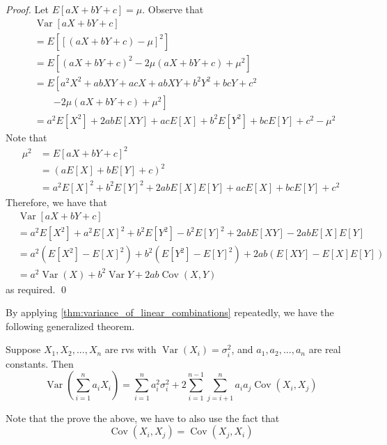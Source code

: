 \documentclass[notoc,notitlepage]{tufte-book}
\DeclareMathOperator{\Var}{Var }
\DeclareMathOperator{\Cov}{Cov }
\begin{document}
\begin{proof}
  Let $E[ aX + bY + c ] = \mu$. Observe that
  \begin{align*}
    &\Var[ aX + bY + c ] \\
    &= E \left[ [ ( aX + bY + c ) - \mu ]^2 \right] \\
    &= E \left[ (aX + bY + c)^2 - 2\mu (aX + bY + c) + \mu^2 \right] \\
    &= E \left[ a^2X^2 + abXY + acX + abXY + b^2 Y^2 + bcY + c^2 \right. \\
    & \qquad \left. - 2\mu(aX + bY+c) + \mu^2 \right] \\
    &= a^2 E[X^2] + 2ab E[XY] + ac E[X] + b^2 E[Y^2] + bc E[Y] + c^2 - \mu^2
  \end{align*}
  Note that
  \begin{align*}
    \mu^2 &= E \left[ aX + bY + c \right]^2 \\
      &= \left( aE[X] + bE[Y] + c \right)^2 \\
      &= a^2 E[X]^2 + b^2 E[Y]^2 + 2abE[X]E[Y] + acE[X] + bcE[Y] + c^2
  \end{align*}
  Therefore, we have that
  \begin{align*}
    &\Var[aX + bY + c] \\
    &= a^2 E[X^2] + a^2 E[X]^2 + b^2 E[Y^2] - b^2 E[Y]^2 + 2ab E[XY] - 2ab E[X]E[Y] \\
    &= a^2 \left( E[X^2] - E[X]^2 \right) + b^2 \left( E[Y^2] - E[Y]^2 \right) + 2ab \left( E[XY] - E[X]E[Y] \right) \\
    &= a^2 \Var(X) + b^2 \Var{Y} + 2ab \Cov(X, Y)
  \end{align*}
  as required. \qed
\end{proof}

By applying \cref{thm:variance_of_linear_combinations} repeatedly, we have the following generalized theorem.

\begin{thm}
\label{thm:generalized_variance_of_linear_combinations}
  Suppose $X_1, X_2, ..., X_n$ are rvs with $\Var(X_i) = \sigma_i^2$, and $a_1, a_2, ..., a_n$ are real constants. Then
  \begin{equation*}
    \Var \left( \sum_{i=1}^{n} a_i X_i \right) = \sum_{i = 1}^{n} a_i^2 \sigma_i^2 + 2 \sum_{i=1}^{n-1} \sum^{n}_{j = i + 1} a_i a_j \Cov(X_i, X_j)
  \end{equation*}
\end{thm}

Note that the prove the above, we have to also use the fact that
\begin{equation*}
  \Cov(X_i, X_j) = \Cov(X_j, X_i)
\end{equation*}
\end{document}
